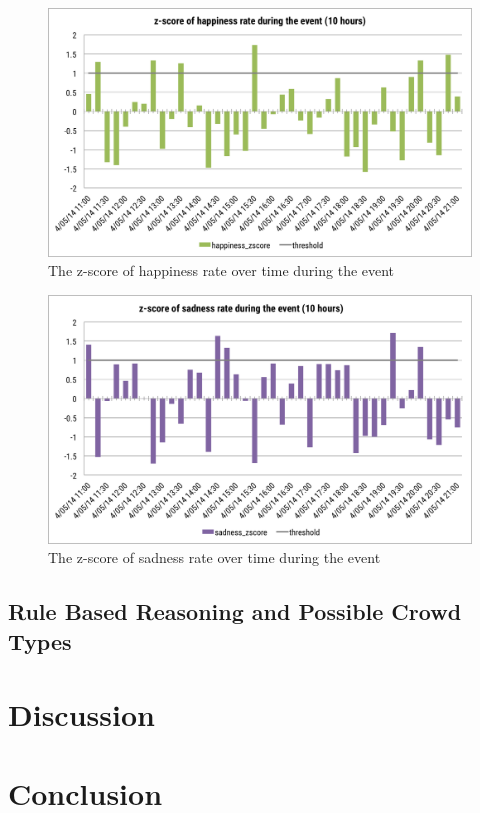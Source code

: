 \begin{figure}[htb!] 
\centering    
\includegraphics[width=1.0\textwidth]{HappinessZscoreEvent}
\caption{The z-score of happiness rate over time during the event}
\label{fig:happinessZscoreEvent}
\end{figure}

\begin{figure}[htb!] 
\centering    
\includegraphics[width=1.0\textwidth]{SadnessZscoreEvent}
\caption{The z-score of sadness rate over time during the event}
\label{fig:sadnessZscoreEvent}
\end{figure}

\subsection{Rule Based Reasoning and Possible Crowd Types}

\section{Discussion}

\section{Conclusion}